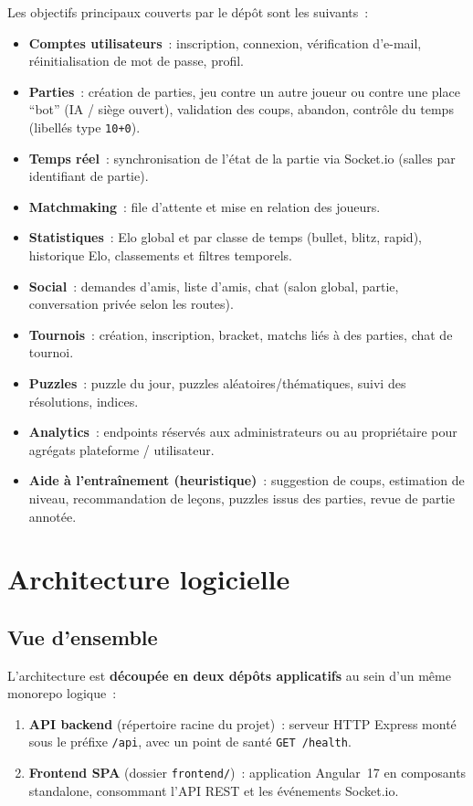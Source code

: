 \documentclass[11pt,a4paper]{report}
\begin{document}
Les objectifs principaux couverts par le dépôt sont les suivants~:
\begin{itemize}[leftmargin=*]
  \item \textbf{Comptes utilisateurs}~: inscription, connexion, vérification d'e-mail, réinitialisation de mot de passe, profil.
  \item \textbf{Parties}~: création de parties, jeu contre un autre joueur ou contre une place ``bot'' (IA / siège ouvert), validation des coups, abandon, contrôle du temps (libellés type \texttt{10+0}).
  \item \textbf{Temps réel}~: synchronisation de l'état de la partie via Socket.io (salles par identifiant de partie).
  \item \textbf{Matchmaking}~: file d'attente et mise en relation des joueurs.
  \item \textbf{Statistiques}~: Elo global et par classe de temps (bullet, blitz, rapid), historique Elo, classements et filtres temporels.
  \item \textbf{Social}~: demandes d'amis, liste d'amis, chat (salon global, partie, conversation privée selon les routes).
  \item \textbf{Tournois}~: création, inscription, bracket, matchs liés à des parties, chat de tournoi.
  \item \textbf{Puzzles}~: puzzle du jour, puzzles aléatoires/thématiques, suivi des résolutions, indices.
  \item \textbf{Analytics}~: endpoints réservés aux administrateurs ou au propriétaire pour agrégats plateforme / utilisateur.
  \item \textbf{Aide à l'entraînement (heuristique)}~: suggestion de coups, estimation de niveau, recommandation de leçons, puzzles issus des parties, revue de partie annotée.
\end{itemize}

\chapter{Architecture logicielle}

\section{Vue d'ensemble}

L'architecture est \textbf{découpée en deux dépôts applicatifs} au sein d'un même monorepo logique~:
\begin{enumerate}
  \item \textbf{API backend} (répertoire racine du projet)~: serveur HTTP Express monté sous le préfixe \texttt{/api}, avec un point de santé \texttt{GET /health}.
  \item \textbf{Frontend SPA} (dossier \texttt{frontend/})~: application Angular~17 en composants standalone, consommant l'API REST et les événements Socket.io.
\end{enumerate}
\end{document}
